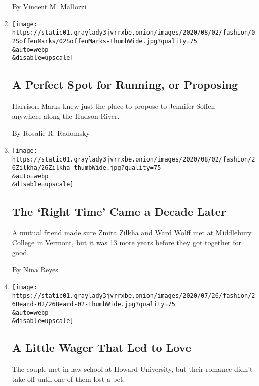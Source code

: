 \begin{enumerate}
  By Vincent M. Mallozzi
\item
  \href{/2020/07/31/fashion/weddings/a-perfect-spot-for-running-or-proposing.html}{}

  \texttt{[image: https://static01.graylady3jvrrxbe.onion/images/2020/08/02/fashion/02SoffenMarks/02SoffenMarks-thumbWide.jpg?quality=75\\\&auto=webp\\\&disable=upscale]}

  \hypertarget{a-perfect-spot-for-running-or-proposing}{%
  \subsection{A Perfect Spot for Running, or
  Proposing}\label{a-perfect-spot-for-running-or-proposing}}

  Harrison Marks knew just the place to propose to Jennifer Soffen ---
  anywhere along the Hudson River.

  By Rosalie R. Radomsky
\item
  \href{/2020/07/31/fashion/weddings/the-right-time-came-a-decade-later.html}{}

  \texttt{[image: https://static01.graylady3jvrrxbe.onion/images/2020/08/02/fashion/26Zilkha/26Zilkha-thumbWide.jpg?quality=75\\\&auto=webp\\\&disable=upscale]}

  \hypertarget{the-right-time-came-a-decade-later}{%
  \subsection{The `Right Time' Came a Decade
  Later}\label{the-right-time-came-a-decade-later}}

  A mutual friend made sure Zmira Zilkha and Ward Wolff met at
  Middlebury College in Vermont, but it was 13 more years before they
  got together for good.

  By Nina Reyes
\item
  \href{/2020/07/24/fashion/weddings/a-little-wager-that-led-to-love.html}{}

  \texttt{[image: https://static01.graylady3jvrrxbe.onion/images/2020/07/26/fashion/26Beard-02/26Beard-02-thumbWide.jpg?quality=75\\\&auto=webp\\\&disable=upscale]}

  \hypertarget{a-little-wager-that-led-to-love}{%
  \subsection{A Little Wager That Led to
  Love}\label{a-little-wager-that-led-to-love}}

  The couple met in law school at Howard University, but their romance
  didn't take off until one of them lost a bet.


\end{enumerate}
